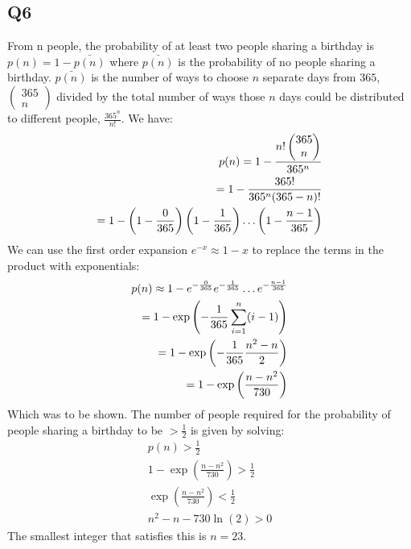 \documentclass[../main.tex]{subfiles}
\begin{document}
\subsection{Q6}
From n people, the probability of at least two people sharing a birthday is $p(n)=1-\bar{p(n)}$ where $\bar{p(n)}$ is the probability of no people sharing a birthday. $\bar{p(n)}$ is the number of ways to choose $n$ separate days from $365$, $\left(\begin{matrix}365 \\ n\end{matrix}\right)$ divided by the total number of ways those $n$ days could be distributed to different people, $\frac{365^n}{n!}$. We have:
\begin{align*}
	p(n) = 1-\frac{n!\left(\begin{matrix}365\\n\end{matrix}\right)}{365^n}\\
	= 1-\frac{365!}{365^n(365-n)!}\\
	=1-\left(1-\frac{0}{365}\right)\left(1-\frac{1}{365}\right)\mathellipsis\left(1-\frac{n-1}{365}\right)
\end{align*}
We can use the first order expansion $e^{-x}\approx 1-x$ to replace the terms in the product with exponentials:
\begin{align}
	p(n)\approx 1-e^{-\frac{0}{365}}e^{-\frac{1}{365}}\mathellipsis e^{-\frac{n-1}{365}}\\
	=1-\exp\left(-\frac{1}{365}\sum_{i=1}^n(i-1)\right)\\
	=1-\exp\left(-\frac{1}{365}\frac{n^2-n}{2}\right)\\
	=1-\exp\left(\frac{n-n^2}{730}\right)
\end{align}
Which was to be shown.
The number of people required for the probability of people sharing a birthday to be $>\frac{1}{2}$ is given by solving:
\begin{align}
	p(n) > \frac{1}{2}\\
	1-\exp\left(\frac{n-n^2}{730}\right)>\frac{1}{2}\\
	\exp\left(\frac{n-n^2}{730}\right)<\frac{1}{2}\\
	n^2-n-730\ln(2)>0
\end{align}
The smallest integer that satisfies this is $n=23$.
\end{document}

